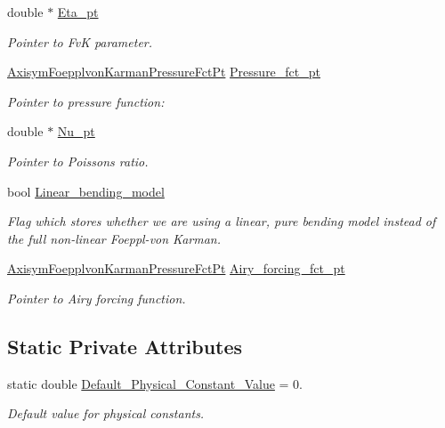 \begin{DoxyCompactItemize}
\item 
double $\ast$ \hyperlink{classoomph_1_1AxisymFoepplvonKarmanEquations_a31a8e3c278b1c2ce7238b71902812ffd}{Eta\+\_\+pt}
\begin{DoxyCompactList}\small\item\em Pointer to FvK parameter. \end{DoxyCompactList}\item 
\hyperlink{classoomph_1_1AxisymFoepplvonKarmanEquations_a504878b18d793ef8a6540eb0f2b086c8}{Axisym\+Foepplvon\+Karman\+Pressure\+Fct\+Pt} \hyperlink{classoomph_1_1AxisymFoepplvonKarmanEquations_a06ebccc2c0b2638657c98f6137de7d4b}{Pressure\+\_\+fct\+\_\+pt}
\begin{DoxyCompactList}\small\item\em Pointer to pressure function\+: \end{DoxyCompactList}\item 
double $\ast$ \hyperlink{classoomph_1_1AxisymFoepplvonKarmanEquations_a02dd0294aa3239752ea7c21018ac65b6}{Nu\+\_\+pt}
\begin{DoxyCompactList}\small\item\em Pointer to Poisson\textquotesingle{}s ratio. \end{DoxyCompactList}\item 
bool \hyperlink{classoomph_1_1AxisymFoepplvonKarmanEquations_a86ab587e241e8950409e38698692c109}{Linear\+\_\+bending\+\_\+model}
\begin{DoxyCompactList}\small\item\em Flag which stores whether we are using a linear, pure bending model instead of the full non-\/linear Foeppl-\/von Karman. \end{DoxyCompactList}\item 
\hyperlink{classoomph_1_1AxisymFoepplvonKarmanEquations_a504878b18d793ef8a6540eb0f2b086c8}{Axisym\+Foepplvon\+Karman\+Pressure\+Fct\+Pt} \hyperlink{classoomph_1_1AxisymFoepplvonKarmanEquations_a30c50341cb3b091ad9ee9a96a62b10bf}{Airy\+\_\+forcing\+\_\+fct\+\_\+pt}
\begin{DoxyCompactList}\small\item\em Pointer to Airy forcing function. \end{DoxyCompactList}\end{DoxyCompactItemize}
\subsection*{Static Private Attributes}
\begin{DoxyCompactItemize}
\item 
static double \hyperlink{classoomph_1_1AxisymFoepplvonKarmanEquations_a0b63093c406541a97199a2a68dcd29e7}{Default\+\_\+\+Physical\+\_\+\+Constant\+\_\+\+Value} = 0.
\begin{DoxyCompactList}\small\item\em Default value for physical constants. \end{DoxyCompactList}\end{DoxyCompactItemize}
